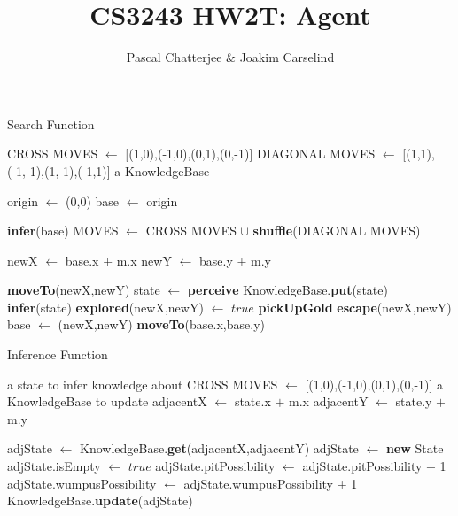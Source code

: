 \documentclass[11pt,a4paper]{article}
\author{Pascal Chatterjee & Joakim Carselind}
\title{CS3243 HW2T: Agent}
\begin{document}
 
\begin{algorithm}
\caption{Search Function}
\label{explore}

\begin{algorithmic}[1]

\REQUIRE CROSS MOVES $\leftarrow$ [(1,0),(-1,0),(0,1),(0,-1)]
\REQUIRE DIAGONAL MOVES $\leftarrow$ [(1,1),(-1,-1),(1,-1),(-1,1)]
\REQUIRE a KnowledgeBase

\STATE origin $\leftarrow$ (0,0)
\STATE base $\leftarrow$ origin

\LOOP
\STATE \textbf{infer}(base)
\STATE MOVES $\leftarrow$ CROSS MOVES $\cup$ \textbf{shuffle}(DIAGONAL MOVES)

\STATE newX $\leftarrow$ base.x $+$ m.x 
\STATE newY $\leftarrow$ base.y $+$ m.y

\STATE \textbf{moveTo}(newX,newY)
\STATE state $\leftarrow$ \textbf{perceive}
\STATE KnowledgeBase.\textbf{put}(state)
\STATE \textbf{infer}(state)
\STATE \textbf{explored}(newX,newY) $\leftarrow$ $true$
\STATE \textbf{pickUpGold}
\STATE \textbf{escape}(newX,newY)
\ENDIF
{}
\STATE base $\leftarrow$ (newX,newY)
\ELSE
\STATE \textbf{moveTo}(base.x,base.y)
\ENDIF
\ENDIF

\ENDFOR
\ENDLOOP
\end{algorithmic}
\end{algorithm}

\newpage

\begin{algorithm}
\caption{Inference Function}
\label{infer}
\begin{algorithmic}[1]
\REQUIRE a state to infer knowledge about
\REQUIRE CROSS MOVES $\leftarrow$ [(1,0),(-1,0),(0,1),(0,-1)]
\REQUIRE a KnowledgeBase to update
\STATE adjacentX $\leftarrow$ state.x $+$ m.x 
\STATE adjacentY $\leftarrow$ state.y $+$ m.y

\STATE adjState $\leftarrow$ KnowledgeBase.\textbf{get}(adjacentX,adjacentY)
\ELSE
\STATE adjState $\leftarrow$ \textbf{new} State
\ENDIF
\STATE
{}
\STATE adjState.isEmpty $\leftarrow$ $true$
\ELSE
{}
\STATE adjState.pitPossibility $\leftarrow$ adjState.pitPossibility + 1
\ENDIF
{}
\STATE adjState.wumpusPossibility $\leftarrow$ adjState.wumpusPossibility + 1
\ENDIF
\ENDIF
\STATE KnowledgeBase.\textbf{update}(adjState)
\ENDFOR
\end{algorithmic}
\end{algorithm}
\end{document}
